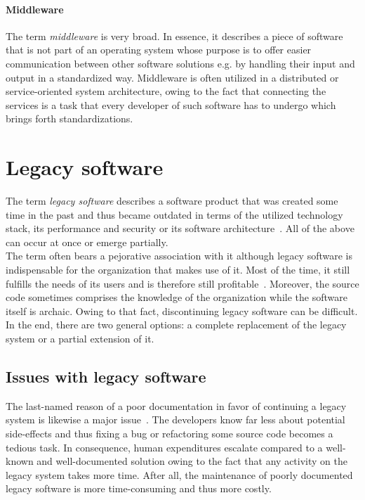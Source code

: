 \documentclass[12pt,a4paper,twoside]{report}
\begin{document}
\paragraph{Middleware}
The term \textit{middleware} is very broad. In essence, it describes a piece
of software that is not part of an operating system whose purpose is to
offer easier communication between other software solutions e.g. by handling
their input and output in a standardized way.
Middleware is often utilized in a distributed or service-oriented system architecture,
owing to the fact that connecting the services is a task that every developer
of such software has to undergo which brings forth standardizations.


\section{Legacy software} \label{sect:legacy-software}

The term \textit{legacy software} describes a software product that was created
some time in the past and thus became outdated in terms of the utilized technology
stack, its performance and security or its software architecture~\cite{seacord-modernizing-legacy}.
All of the above can occur at once or emerge partially.\\
The term often bears a pejorative association with it although legacy software
is indispensable for the organization that makes use of it. Most of the time, it
still fulfills the needs of its users and is therefore still profitable~\cite{bennett-coping-legacy}.
Moreover, the source code sometimes comprises the knowledge of the organization while
the software itself is archaic. Owing to that fact, discontinuing legacy software can be difficult.
In the end, there are two general options: a complete replacement of the legacy system or
a partial extension of it.


\subsection{Issues with legacy software} \label{issues-legacy-software}

The last-named reason of a poor documentation in favor of continuing a
legacy system is likewise a major issue~\cite{bisbal-legacy-issues}.
The developers know far less about potential side-effects and thus
fixing a bug or refactoring some source code becomes a tedious task.
In consequence, human expenditures escalate compared to a well-known and well-documented
solution owing to the fact that any activity on the legacy system takes more time.
After all, the maintenance of poorly documented legacy software
is more time-consuming and thus more costly.
\end{document}
